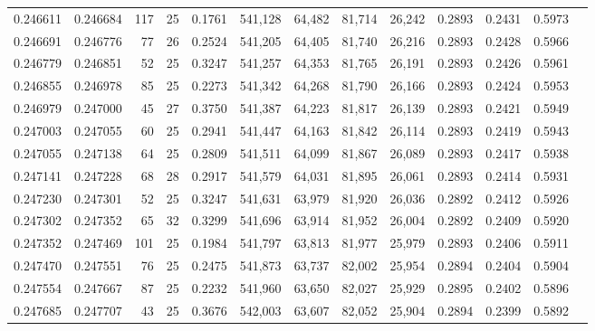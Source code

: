 \begin{tabular}{rrrrrrrrrrrrr}
0.246611 & 0.246684 & 117 &  25 &                                     0.1761 & 541,128 &  64,482 &  81,714 &  26,242 & 0.2893 & 0.2431 & 0.5973 \\
0.246691 & 0.246776 &  77 &  26 &                                     0.2524 & 541,205 &  64,405 &  81,740 &  26,216 & 0.2893 & 0.2428 & 0.5966 \\
0.246779 & 0.246851 &  52 &  25 &                                     0.3247 & 541,257 &  64,353 &  81,765 &  26,191 & 0.2893 & 0.2426 & 0.5961 \\
0.246855 & 0.246978 &  85 &  25 &                                     0.2273 & 541,342 &  64,268 &  81,790 &  26,166 & 0.2893 & 0.2424 & 0.5953 \\
0.246979 & 0.247000 &  45 &  27 &                                     0.3750 & 541,387 &  64,223 &  81,817 &  26,139 & 0.2893 & 0.2421 & 0.5949 \\
0.247003 & 0.247055 &  60 &  25 &                                     0.2941 & 541,447 &  64,163 &  81,842 &  26,114 & 0.2893 & 0.2419 & 0.5943 \\
0.247055 & 0.247138 &  64 &  25 &                                     0.2809 & 541,511 &  64,099 &  81,867 &  26,089 & 0.2893 & 0.2417 & 0.5938 \\
0.247141 & 0.247228 &  68 &  28 &                                     0.2917 & 541,579 &  64,031 &  81,895 &  26,061 & 0.2893 & 0.2414 & 0.5931 \\
0.247230 & 0.247301 &  52 &  25 &                                     0.3247 & 541,631 &  63,979 &  81,920 &  26,036 & 0.2892 & 0.2412 & 0.5926 \\
0.247302 & 0.247352 &  65 &  32 &                                     0.3299 & 541,696 &  63,914 &  81,952 &  26,004 & 0.2892 & 0.2409 & 0.5920 \\
0.247352 & 0.247469 & 101 &  25 &                                     0.1984 & 541,797 &  63,813 &  81,977 &  25,979 & 0.2893 & 0.2406 & 0.5911 \\
0.247470 & 0.247551 &  76 &  25 &                                     0.2475 & 541,873 &  63,737 &  82,002 &  25,954 & 0.2894 & 0.2404 & 0.5904 \\
0.247554 & 0.247667 &  87 &  25 &                                     0.2232 & 541,960 &  63,650 &  82,027 &  25,929 & 0.2895 & 0.2402 & 0.5896 \\
0.247685 & 0.247707 &  43 &  25 &                                     0.3676 & 542,003 &  63,607 &  82,052 &  25,904 & 0.2894 & 0.2399 & 0.5892 \\

\end{tabular}
